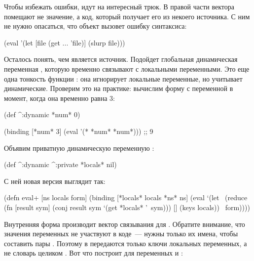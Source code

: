 Чтобы избежать ошибки, идут на интересный трюк. В правой части вектора  помещают не значение, а код, который получает его из некоего источника. С ним не нужно опасаться, что объект  вызовет ошибку синтаксиса:

\begin{english}
  \begin{clojure}
(eval '(let [file (get ... 'file)]
         (slurp file)))
  \end{clojure}
\end{english}

Осталось понять, чем является источник. Подойдет глобальная динамическая переменная , которую временно связывают с локальными переменными. Это еще одна тонкость функции : она игнорирует локальные переменные, но учитывает динамические. Проверим это на практике: вычислим форму с переменной  в момент, когда она временно равна 3:

\begin{english}
  \begin{clojure}
(def ^:dynamic *num* 0)

(binding [*num* 3]
  (eval '(* *num* *num*)))
;; 9
  \end{clojure}
\end{english}

Объявим приватную динамическую переменную :

\begin{english}
  \begin{clojure}
(def ^:dynamic ^:private
  *locals* nil)
  \end{clojure}
\end{english}

С ней новая версия  выглядит так:

\begin{english}
  \begin{clojure/lines}
(defn eval+ [ns locals form]
  (binding [*locals* locals
            *ns* ns]
    (eval
     `(let ~(reduce
             (fn [result sym]
               (conj result sym `(get *locals* '~sym)))
             []
             (keys locals))
        ~form))))
  \end{clojure/lines}
\end{english}

Внутренняя форма   производит вектор связывания для . Обратите внимание, что значения переменных не участвуют в коде~--- нужны только их имена, чтобы составить пары . Поэтому в  передаются только ключи локальных переменных, а не словарь целиком . Вот что построит  для переменных  и :

